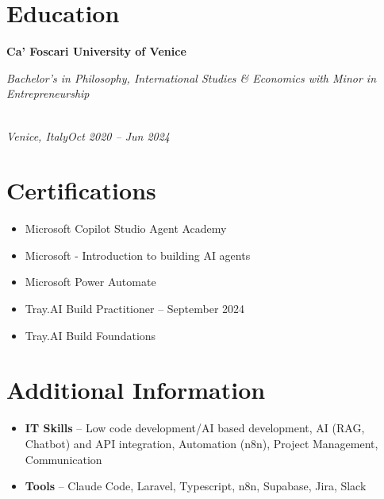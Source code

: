 \documentclass[a4paper,10pt]{article}
\newcommand{\role}[4]{\vspace{3pt}\noindent\hspace{0.6em}\parbox[t]{0.38\textwidth}{\raggedright\textbf{#1}}\hfill\parbox[t]{0.58\textwidth}{\raggedleft\textit{#2}}\\{\textit{#3}\hfill\textit{#4}}\vspace{1pt}}
\begin{document}
\section{Education}
\role{Ca' Foscari University of Venice}{Bachelor's in Philosophy, International Studies \& Economics with Minor in Entrepreneurship}{Venice, Italy}{Oct 2020 -- Jun 2024}

\section{Certifications}
\begin{itemize}
\item Microsoft Copilot Studio Agent Academy
\item Microsoft - Introduction to building AI agents
\item Microsoft Power Automate
\item Tray.AI Build Practitioner -- September 2024
\item Tray.AI Build Foundations
\end{itemize}

\section{Additional Information}
\begin{itemize}
\item \textbf{IT Skills} -- Low code development/AI based development, AI (RAG, Chatbot) and API integration, Automation (n8n), Project Management, Communication
\item \textbf{Tools} -- Claude Code, Laravel, Typescript, n8n, Supabase, Jira, Slack
\end{itemize}
\end{document}
